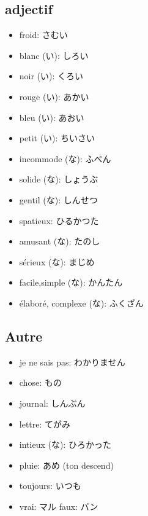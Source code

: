 \documentclass{article}
\begin{document}
\begin{CJK}{UTF8}{min}
    \subsection{adjectif}
    \begin{itemize}
        \item froid: さむい
        \item blanc (い): しろい
        \item noir (い): くろい
        \item rouge (い): あかい
        \item bleu (い): あおい
        \item petit (い): ちいさい
        \item incommode (な): ふべん
        \item solide (な): しょうぶ
        \item gentil (な): しんせつ
        \item spatieux: ひるかつた
        \item amusant (な): たのし
        \item sérieux (な): まじめ
        \item facile,simple (な): かんたん
        \item élaboré, complexe (な): ふくざん
    \end{itemize}
    \subsection{Autre}
    \begin{itemize}
        \item je ne sais pas: わかりません
        \item chose: もの
        \item journal: しんぶん
        \item lettre: てがみ
        \item intieux (な): ひろかった
        \item pluie: あめ (ton descend)
        \item toujours: いつも
        \item vrai: マル faux: バン
    \end{itemize}
\end{CJK}
\end{document}
